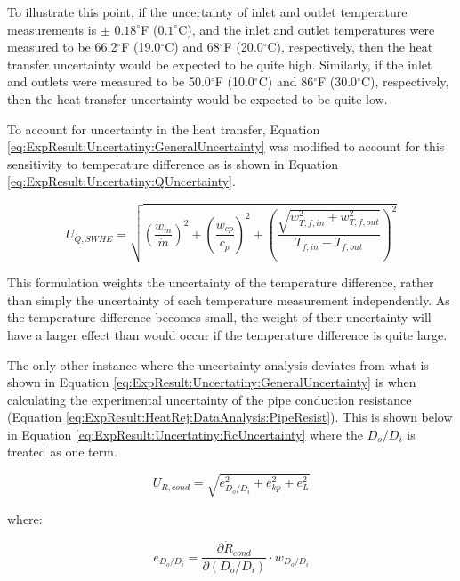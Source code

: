 To illustrate this point, if the uncertainty of inlet and outlet temperature measurements is $\pm$ $0.18^\circ$F ($0.1^\circ$C), and the inlet and outlet temperatures were measured to be 66.2$^\circ$F (19.0$^\circ$C) and 68$^\circ$F (20.0$^\circ$C), respectively, then the heat transfer uncertainty would be expected to be quite high. Similarly, if the inlet and outlets were measured to be 50.0$^\circ$F (10.0$^\circ$C) and 86$^\circ$F (30.0$^\circ$C), respectively, then the heat transfer uncertainty would be expected to be quite low. 

To account for uncertainty in the heat transfer, Equation \ref{eq:ExpResult:Uncertatiny:GeneralUncertainty} was modified to account for this sensitivity to temperature difference as is shown in Equation \ref{eq:ExpResult:Uncertatiny:QUncertainty}.

	\begin{equation}
		U_{\dot{Q},SWHE} = \sqrt{\left(\frac{w_{\dot{m}}}{\dot{m}}\right)^2 + \left(\frac{w_{cp}}{c_p}\right)^2 + \left(\frac{\sqrt{w_{T,f,in}^2 + w_{T,f,out}^2}}{T_{f,in} - T_{f,out}}\right)^2}
		\label{eq:ExpResult:Uncertatiny:QUncertainty}
	\end{equation}
	
This formulation weights the uncertainty of the temperature difference, rather than simply the uncertainty of each temperature measurement independently. As the temperature difference becomes small, the weight of their uncertainty will have a larger effect than would occur if the temperature difference is quite large.

The only other instance where the uncertainty analysis deviates from what is shown in Equation \ref{eq:ExpResult:Uncertatiny:GeneralUncertainty} is when calculating the experimental uncertainty of the pipe conduction resistance (Equation \ref{eq:ExpResult:HeatRej:DataAnalysis:PipeResist}). This is shown below in Equation \ref{eq:ExpResult:Uncertatiny:RcUncertainty} where the $D_o/D_i$ is treated as one term.  

	\begin{equation}
		U_{R,cond} = \sqrt{e_{D_o/D_i}^2 + e_{kp}^2 + e_{L}^2}
		\label{eq:ExpResult:Uncertatiny:RcUncertainty}
	\end{equation}
	
	\centerline{where:}
	
	\begin{equation*}
	e_{D_o/D_i} = \frac{\partial \dot{R}_{cond}}{\partial (D_o/D_i)} \cdot w_{D_o/D_i}
	\end{equation*}
	
